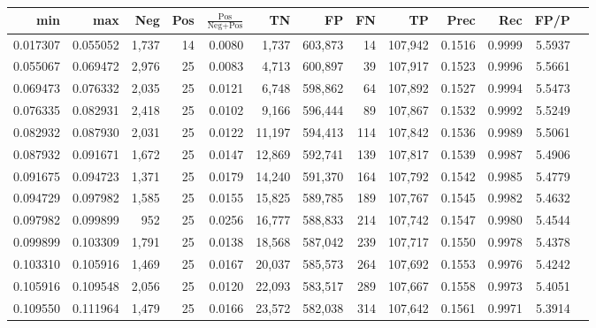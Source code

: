 \begin{tabular}{rrrrrrrrrrrrr}
\toprule
     min &      max &   Neg & Pos & $\frac{\text{Pos}}{\text{Neg}+\text{Pos}}$ &      TN &      FP &      FN &      TP &   Prec &    Rec &   FP/P \\
\midrule
0.017307 & 0.055052 & 1,737 &  14 &                                     0.0080 &   1,737 & 603,873 &      14 & 107,942 & 0.1516 & 0.9999 & 5.5937 \\
0.055067 & 0.069472 & 2,976 &  25 &                                     0.0083 &   4,713 & 600,897 &      39 & 107,917 & 0.1523 & 0.9996 & 5.5661 \\
0.069473 & 0.076332 & 2,035 &  25 &                                     0.0121 &   6,748 & 598,862 &      64 & 107,892 & 0.1527 & 0.9994 & 5.5473 \\
0.076335 & 0.082931 & 2,418 &  25 &                                     0.0102 &   9,166 & 596,444 &      89 & 107,867 & 0.1532 & 0.9992 & 5.5249 \\
0.082932 & 0.087930 & 2,031 &  25 &                                     0.0122 &  11,197 & 594,413 &     114 & 107,842 & 0.1536 & 0.9989 & 5.5061 \\
0.087932 & 0.091671 & 1,672 &  25 &                                     0.0147 &  12,869 & 592,741 &     139 & 107,817 & 0.1539 & 0.9987 & 5.4906 \\
0.091675 & 0.094723 & 1,371 &  25 &                                     0.0179 &  14,240 & 591,370 &     164 & 107,792 & 0.1542 & 0.9985 & 5.4779 \\
0.094729 & 0.097982 & 1,585 &  25 &                                     0.0155 &  15,825 & 589,785 &     189 & 107,767 & 0.1545 & 0.9982 & 5.4632 \\
0.097982 & 0.099899 &   952 &  25 &                                     0.0256 &  16,777 & 588,833 &     214 & 107,742 & 0.1547 & 0.9980 & 5.4544 \\
0.099899 & 0.103309 & 1,791 &  25 &                                     0.0138 &  18,568 & 587,042 &     239 & 107,717 & 0.1550 & 0.9978 & 5.4378 \\
0.103310 & 0.105916 & 1,469 &  25 &                                     0.0167 &  20,037 & 585,573 &     264 & 107,692 & 0.1553 & 0.9976 & 5.4242 \\
0.105916 & 0.109548 & 2,056 &  25 &                                     0.0120 &  22,093 & 583,517 &     289 & 107,667 & 0.1558 & 0.9973 & 5.4051 \\
0.109550 & 0.111964 & 1,479 &  25 &                                     0.0166 &  23,572 & 582,038 &     314 & 107,642 & 0.1561 & 0.9971 & 5.3914 \\

\end{tabular}
